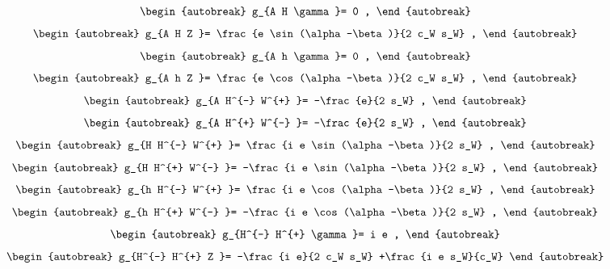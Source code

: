 \begin{align}
\begin{autobreak}
g_{A H \gamma }=
	0
	,
\end{autobreak}
\end{align}
\begin{align}
\begin{autobreak}
g_{A H Z }=
	\frac{e \sin (\alpha -\beta )}{2 c_W s_W}
	,
\end{autobreak}
\end{align}
\begin{align}
\begin{autobreak}
g_{A h \gamma }=
	0
	,
\end{autobreak}
\end{align}
\begin{align}
\begin{autobreak}
g_{A h Z }=
	\frac{e \cos (\alpha -\beta )}{2 c_W s_W}
	,
\end{autobreak}
\end{align}
\begin{align}
\begin{autobreak}
g_{A H^{-} W^{+} }=
	-\frac{e}{2 s_W}
	,
\end{autobreak}
\end{align}
\begin{align}
\begin{autobreak}
g_{A H^{+} W^{-} }=
	-\frac{e}{2 s_W}
	,
\end{autobreak}
\end{align}
\begin{align}
\begin{autobreak}
g_{H H^{-} W^{+} }=
	\frac{i e \sin (\alpha -\beta )}{2 s_W}
	,
\end{autobreak}
\end{align}
\begin{align}
\begin{autobreak}
g_{H H^{+} W^{-} }=
	-\frac{i e \sin (\alpha -\beta )}{2 s_W}
	,
\end{autobreak}
\end{align}
\begin{align}
\begin{autobreak}
g_{h H^{-} W^{+} }=
	\frac{i e \cos (\alpha -\beta )}{2 s_W}
	,
\end{autobreak}
\end{align}
\begin{align}
\begin{autobreak}
g_{h H^{+} W^{-} }=
	-\frac{i e \cos (\alpha -\beta )}{2 s_W}
	,
\end{autobreak}
\end{align}
\begin{align}
\begin{autobreak}
g_{H^{-} H^{+} \gamma }=
	i e
	,
\end{autobreak}
\end{align}
\begin{align}
\begin{autobreak}
g_{H^{-} H^{+} Z }=
	-\frac{i e}{2 c_W s_W}
	+\frac{i e s_W}{c_W}
\end{autobreak}
\end{align}
